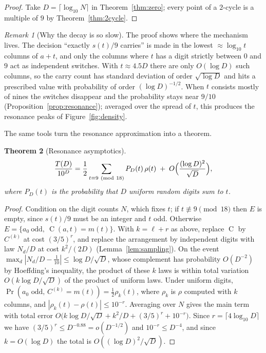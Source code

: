 \documentclass[11pt]{article}
\newtheorem{theorem}{Theorem}[section]
\theoremstyle{definition}
\theoremstyle{remark}
\newtheorem{remark}[theorem]{Remark}
\newcommand{\C}{\operatorname{C}}
\begin{document}
\begin{proof}
Take $D=\lceil\log_{10}N\rceil$ in Theorem~\ref{thm:zero}; every point of a
$2$-cycle is a multiple of $9$ by Theorem~\ref{thm:2cycle}.
\end{proof}

\begin{remark}[Why the decay is so slow]
The proof shows where the mechanism lives. The decision ``exactly $s(t)/9$
carries'' is made in the lowest $\approx\log_{10}t$ columns of $a+t$, and only
the columns where $t$ has a digit strictly between $0$ and $9$ act as
independent switches. With $t\approx4.5D$ there are only $O(\log D)$ such
columns, so the carry count has standard deviation of order $\sqrt{\log D}$ and
hits a prescribed value with probability of order $(\log D)^{-1/2}$. When $t$
consists mostly of nines the switches disappear and the probability stays
near $9/10$ (Proposition~\ref{prop:resonance}); averaged over the spread of
$t$, this produces the resonance peaks of Figure~\ref{fig:density}.
\end{remark}

The same tools turn the resonance approximation into a theorem.

\begin{theorem}[Resonance asymptotics]\label{thm:resrig}
\[
  \frac{T(D)}{10^D}=\frac12\sum_{t\equiv9\ (\mathrm{mod}\ 18)}P_D(t)\,\rho(t)
  \;+\;O\Bigl(\frac{(\log D)^2}{\sqrt D}\Bigr),
\]
where $P_D(t)$ is the probability that $D$ uniform random digits sum to $t$.
\end{theorem}

\begin{proof}
Condition on the digit counts $N$, which fixes $t$; if $t\not\equiv9\pmod{18}$
then $E$ is empty, since $s(t)/9$ must be an integer and $t$ odd. Otherwise
$E=\{a_0\ \text{odd},\ \C(a,t)=m(t)\}$. With $k=\ell+r$ as above, replace
$\C$ by $C^{(k)}$ at cost $(3/5)^r$, and replace the arrangement by
independent digits with law $N_d/D$ at cost $k^2/(2D)$
(Lemma~\ref{lem:sampling}). On the event $\max_d|N_d/D-\tfrac1{10}|\le\log
D/\sqrt D$, whose complement has probability $O(D^{-2})$ by Hoeffding's
inequality, the product of these $k$ laws is within total variation
$O(k\log D/\sqrt D)$ of the product of uniform laws. Under uniform digits,
$\Pr(a_0\text{ odd},\,C^{(k)}=m(t))=\tfrac12\rho_k(t)$, where $\rho_k$ is
$\rho$ computed with $k$ columns, and $|\rho_k(t)-\rho(t)|\le10^{-r}$.
Averaging over $N$ gives the main term with total error
$O\bigl(k\log D/\sqrt D+k^2/D+(3/5)^r+10^{-r}\bigr)$. Since
$r=\lceil4\log_{10}D\rceil$ we have $(3/5)^r\le D^{-0.88}=o(D^{-1/2})$ and
$10^{-r}\le D^{-4}$, and since $k=O(\log D)$ the total is
$O((\log D)^2/\sqrt D)$.
\end{proof}
\end{document}
